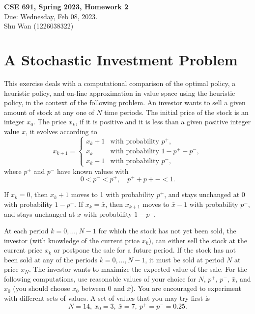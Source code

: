 \documentclass[11pt]{article}
\begin{document}
\begin{center}
\Large{
\textbf{CSE 691, Spring 2023, Homework 2} \\
Due: Wednesday, Feb 08, 2023. \\
Shu Wan (1226038322)
}
\end{center}

\section*{A Stochastic Investment Problem}

This exercise deals with a computational comparison of the optimal policy, a heuristic policy, and on-line approximation in value space using the heuristic policy, in the context of the following problem. An investor wants to sell a given amount of stock at any one of $N$ time periods. The initial price of the stock is an integer $x_0$. The price $x_k$, if it is positive and it is less than a given positive integer value $\bar x$, it evolves according to
\begin{equation}\label{eq:1}
x_{k+1} = \begin{cases}
x_{k} + 1 & \text{with probability } p^+, \\
x_{k} & \text{with probability } 1 - p^+ - p^-, \\
x_{k} - 1 & \text{with probability } p^-,
\end{cases}
\end{equation}
where $p^+$ and $p^-$ have known values with
\[
0 < p^- < p^+, \quad p^+ + p+- < 1.
\]

If $x_k = 0$, then $x_k+1$ moves to 1 with probability $p^+$, and stays unchanged at 0 with probability $1 -p^+$. If $x_k = \bar x$, then $x_{k+1}$ moves to $\bar x - 1$ with probability
$p^-$, and stays unchanged at $\bar x$ with probability $1 -p^-$. 

At each period $k = 0, \dots, N - 1$ for which the stock has not yet been sold, the investor (with knowledge of the current price $x_k$), can either sell the stock
at the current price $x_k$ or postpone the sale for a future period. If the stock has not been sold at any of the periods $k = 0, . . . ,N - 1$, it must be sold at period
$N$ at price $x_N$. The investor wants to maximize the expected value of the sale.
For the following computations, use reasonable values of your choice for $N$, $p^+$,
$p^-$, $\bar x$, and $x_0$ (you should choose $x_0$ between 0 and $\bar x$). You are encouraged to experiment with different sets of values. A set of values that you may try first is
\begin{equation}\label{eq:2}
    N = 14, ~x_0 = 3, ~\bar x = 7, ~p^+ = p^- = 0.25.
\end{equation}
\end{document}
